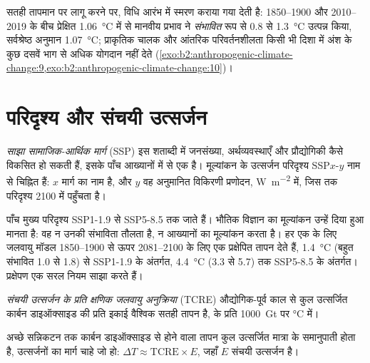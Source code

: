 सतही तापमान पर लागू करने पर, विधि आरंभ में स्मरण कराया गया  देती है: 1850--1900 और
2010--2019 के बीच प्रेक्षित \qty{1.06}{\celsius} में से मानवीय प्रभाव ने \emph{संभावित} रूप से
0.8 से \qty{1.3}{\celsius} उत्पन्न किया, सर्वश्रेष्ठ अनुमान \qty{1.07}{\celsius}; प्राकृतिक चालक और
आंतरिक परिवर्तनशीलता किसी भी दिशा में अंश के कुछ दसवें भाग से अधिक योगदान नहीं देते
(\cref{exo:b2:anthropogenic-climate-change:9,exo:b2:anthropogenic-climate-change:10})।

\section{परिदृश्य और संचयी उत्सर्जन}\label{sec:b2:anthropogenic-climate-change:scenarios}

\begin{definition}[साझा सामाजिक-आर्थिक मार्ग]\label{def:b2:anthropogenic-climate-change:ssp}
\emph{साझा सामाजिक-आर्थिक मार्ग} (SSP) इस शताब्दी में जनसंख्या,
अर्थव्यवस्थाएँ और प्रौद्योगिकी कैसे विकसित हो सकती हैं, इसके पाँच आख्यानों में से एक है। मूल्यांकन के
उत्सर्जन परिदृश्य SSP$x$-$y$ नाम से चिह्नित हैं: $x$ मार्ग का नाम है, और $y$ वह
अनुमानित विकिरणी प्रणोदन, \unit{W.m^{-2}} में, जिस तक परिदृश्य 2100 में पहुँचता है।
\end{definition}

पाँच मुख्य परिदृश्य SSP1-1.9 से SSP5-8.5 तक जाते हैं। भौतिक विज्ञान का मूल्यांकन उन्हें
दिया हुआ मानता है: वह न उनकी संभाविता तौलता है, न आख्यानों का मूल्यांकन करता है। हर एक के लिए जलवायु मॉडल
1850--1900 से ऊपर 2081--2100 के लिए एक प्रक्षेपित तापन देते हैं, \qty{1.4}{\celsius} (बहुत संभावित 1.0
से 1.8) से SSP1-1.9 के अंतर्गत, \qty{4.4}{\celsius} (3.3 से 5.7) तक SSP5-8.5 के अंतर्गत। प्रक्षेपण एक
सरल नियम साझा करते हैं।

\begin{definition}[संचयी CO$_2$ उत्सर्जन के प्रति क्षणिक जलवायु अनुक्रिया]\label{def:b2:anthropogenic-climate-change:tcre}
\emph{संचयी  उत्सर्जन के प्रति क्षणिक जलवायु
अनुक्रिया} (TCRE) औद्योगिक-पूर्व काल से
कुल उत्सर्जित कार्बन डाइऑक्साइड की प्रति इकाई वैश्विक सतही तापन है,  के प्रति
\qty{1000}{Gt} पर \unit{\celsius} में।
\end{definition}

\begin{proposition}\label{prop:b2:anthropogenic-climate-change:tcre}
अच्छे सन्निकटन तक कार्बन डाइऑक्साइड से होने वाला तापन कुल उत्सर्जित मात्रा के समानुपाती होता है,
उत्सर्जनों का मार्ग चाहे जो हो: $\Delta T \approx \text{TCRE} \times E$, जहाँ $E$ संचयी
उत्सर्जन है।
\end{proposition}
\admitted

